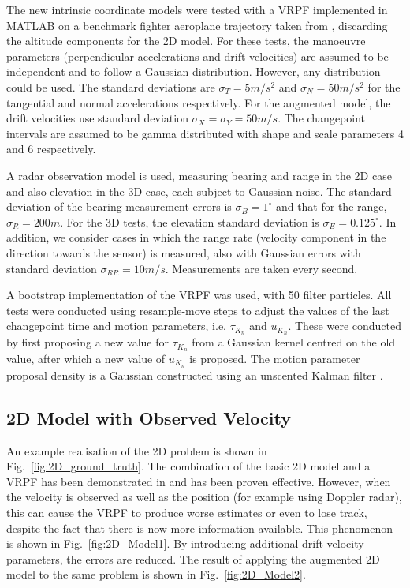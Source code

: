 \documentclass[conference]{IEEEtran}
\begin{document}
%
The new intrinsic coordinate models were tested with a VRPF implemented in MATLAB on a benchmark fighter aeroplane trajectory taken from \cite{Blair1998}, discarding the altitude components for the 2D model. For these tests, the manoeuvre parameters (perpendicular accelerations and drift velocities) are assumed to be independent and to follow a Gaussian distribution. However, any distribution could be used. The standard deviations are $\sigma_T = 5 m/s^2$ and $\sigma_N = 50 m/s^2$ for the tangential and normal accelerations respectively. For the augmented model, the drift velocities use standard deviation $\sigma_X = \sigma_Y = 50 m/s$. The changepoint intervals are assumed to be gamma distributed with shape and scale parameters 4 and 6 respectively.

A radar observation model is used, measuring bearing and range in the 2D case and also elevation in the 3D case, each subject to Gaussian noise. The standard deviation of the bearing measurement errors is $\sigma_B = 1^{\circ}$ and that for the range, $\sigma_R = 200m$. For the 3D tests, the elevation standard deviation is $\sigma_E = 0.125^{\circ}$. In addition, we consider cases in which the range rate (velocity component in the direction towards the sensor) is measured, also with Gaussian errors with standard deviation $\sigma_{RR} = 10m/s$. Measurements are taken every second.

A bootstrap implementation of the VRPF was used, with 50 filter particles. All tests were conducted using resample-move steps to adjust the values of the last changepoint time and motion parameters, i.e. $\tau_{K_n}$ and $u_{K_n}$. These were conducted by first proposing a new value for $\tau_{K_n}$ from a Gaussian kernel centred on the old value, after which a new value of $u_{K_n}$ is proposed. The motion parameter proposal density is a Gaussian constructed using an unscented Kalman filter \cite{Julier2004}.



\subsection{2D Model with Observed Velocity}

An example realisation of the 2D problem is shown in Fig.~\ref{fig:2D_ground_truth}. The combination of the basic 2D model and a VRPF has been demonstrated in \cite{Godsill2007} and has been proven effective. However, when the velocity is observed as well as the position (for example using Doppler radar), this can cause the VRPF to produce worse estimates or even to lose track, despite the fact that there is now more information available. This phenomenon is shown in Fig.~\ref{fig:2D_Model1}. By introducing additional drift velocity parameters, the errors are reduced. The result of applying the augmented 2D model to the same problem is shown in Fig.~\ref{fig:2D_Model2}.
\end{document}
